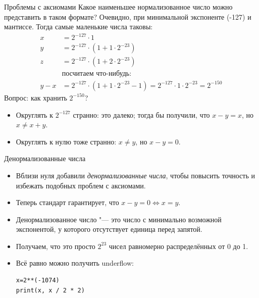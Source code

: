 \begin{frame}{Проблемы с аксиомами}
	Какое наименьшее нормализованное число можно представить в таком формате?
	Очевидно, при минимальной экспоненте (-127) и мантиссе.
	Тогда самые маленькие числа таковы:
	\begin{align*}
		x &= 2^{-127} \cdot 1 \\
		y &= 2^{-127} \cdot (1 + 1 \cdot 2^{-23}) \\
		z &= 2^{-127} \cdot (1 + 2 \cdot 2^{-23}) \\
		& \text{посчитаем что-нибудь:} \\
		y - x &= 2^{-127} \cdot (1 + 1 \cdot 2^{-23} - 1) = 2^{-127} \cdot 1 \cdot 2^{-23} = 2^{-150}
	\end{align*}
	Вопрос: как хранить $2^{-150}$?
	\begin{itemize}
		\item
			Округлять к $2^{-127}$ странно: это далеко; тогда бы получили, что $x-y=x$, но $x\neq x + y$.
		\item
			Округлять к нулю тоже странно: $x \neq y$, но $x - y = 0$.
	\end{itemize}
\end{frame}

\begin{frame}[fragile]{Денормализованные числа}
	\begin{itemize}
		\item 
			Вблизи нуля добавили \textit{денормализованные числа}, чтобы повысить точность и избежать подобных проблем с аксиомами.
		\item
			Теперь стандарт гарантирует, что $x - y = 0 \iff x = y$.
		\item
			Денормализованное число "--- это число с минимально возможной экспонентой, у которого отсутствует единица перед запятой.
		\item
			Получаем, что это просто $2^{23}$ чисел равномерно распределённых от 0 до 1.
		\item
			Всё равно можно получить underflow:
\begin{verbatim}
x=2**(-1074)
print(x, x / 2 * 2)
\end{verbatim}
	\end{itemize}
\end{frame}

